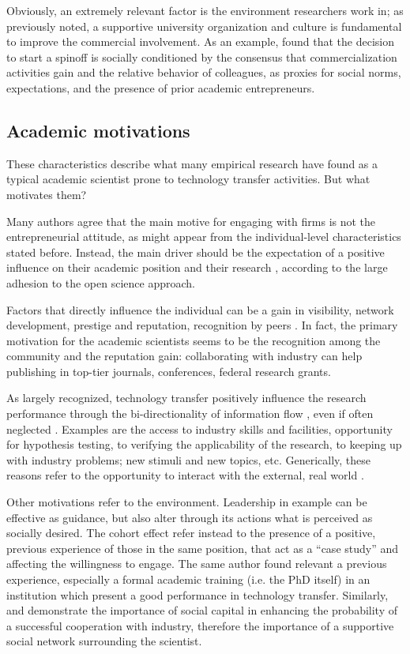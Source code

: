 Obviously, an extremely relevant factor is the environment researchers work in; as previously noted, a supportive university organization and culture is fundamental to improve the commercial involvement. As an example, \citet{OShea2004} found that the decision to start a spinoff is socially conditioned by the consensus that commercialization activities gain and the relative behavior of colleagues, as proxies for social norms, expectations, and the presence of prior academic entrepreneurs. 

\subsection{Academic motivations}

These characteristics describe what many empirical research have found as a typical academic scientist prone to technology transfer activities. But what motivates them? 

Many authors agree that the main motive for engaging with firms is not the entrepreneurial attitude, as might appear from the individual-level characteristics stated before. Instead, the main driver should be the expectation of a positive influence on their academic position and their research \citep{Fini2009, DEste2011}, according to the large adhesion to the open science approach.

Factors that directly influence the individual can be a gain in visibility, network development, prestige and reputation, recognition by peers \citep{Baldini2007, Fini2009, Rizzo2015}. In fact, the primary motivation for the academic scientists seems to be the recognition among the community and the reputation gain: collaborating with industry can help publishing in top-tier journals, conferences, federal research grants.

As largely recognized, technology transfer positively influence the research performance through the bi-directionality of information flow \citep{Geuna2009}, even if often neglected \citep{DEste2007}. Examples are the access to industry skills and facilities, opportunity for hypothesis testing, to verifying the applicability of the research, to keeping up with industry problems; new stimuli and new topics, etc. Generically, these reasons refer to the opportunity to interact with the external, real world \citep{Baldini2007}. 

Other motivations refer to the environment. Leadership in example can be effective as guidance, but also alter through its actions what is perceived as socially desired. The cohort effect \citep{Bercovitz2006} refer instead to the presence of a positive, previous experience of those in the same position, that act as a \enquote{case study} and affecting the willingness to engage. The same author found relevant a previous experience, especially a formal academic training (i.e. the PhD itself) in an institution which present a good performance in technology transfer. Similarly, \citet{Murray2004} and \citet{Link2007} demonstrate the importance of social capital in enhancing the probability of a successful cooperation with industry, therefore the importance of a supportive social network surrounding the scientist.

